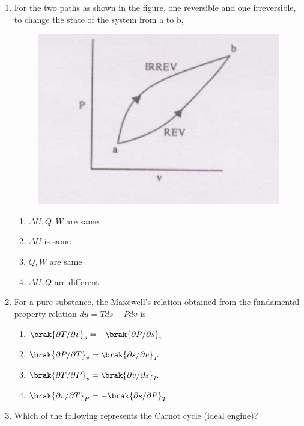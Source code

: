 \documentclass[journal,12pt,onecolumn]{IEEEtran}
\theoremstyle{remark}
\begin{document}
\begin{enumerate}
    \item For the two paths as shown in the figure, one reversible and one irreversible, to change the state of the system from a to b,
    \begin{figure}[H]
        \centering
        \includegraphics[width=0.5\columnwidth]{figs/30.png}
        \caption{}
        \label{fig:30}
    \end{figure}
\begin{multicols}{2}
    \begin{enumerate}
        \item $\Delta U,Q,W$ are same
        \item $\Delta U$ is same
        \item $Q, W$ are same
        \item $\Delta U, Q$ are different
    \end{enumerate}
\end{multicols}

    \item For a pure substance, the Maxewell's relation obtained from the fundamental property relation $du=Tds-Pdv$ is

\begin{multicols}{2}
    \begin{enumerate}
        \item $\brak{\partial T/\partial v}_s=-\brak{\partial P/\partial s}_v$
        \item $\brak{\partial P/\partial T}_v=\brak{\partial s/\partial v}_T$
        \item $\brak{\partial T/\partial P}_s=\brak{\partial v/\partial s}_P$
        \item $\brak{\partial v/\partial T}_P=-\brak{\partial s/\partial P}_T$
    \end{enumerate}
\end{multicols}

    \item Which of the following represents the Carnot cycle (ideal engine)?


\end{enumerate}
\end{document}
